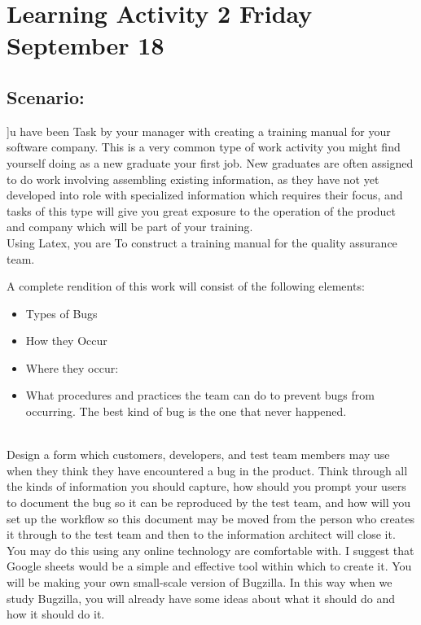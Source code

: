 \section{Learning Activity 2  Friday September 18}

\subsection{Scenario:}

]u have been Task by your manager with creating a training manual for your software company. This is a very common type of work activity you might find yourself doing as a new graduate your first job. New graduates are often assigned to do work involving assembling existing information, as they have not yet developed into role with specialized information which requires their focus, and tasks of this type will give you great exposure to the operation of the product and company which will be part of your training.
\\
Using Latex, you are To construct a training manual for the quality assurance team.

A complete rendition of this work will consist of the following elements:
\begin{itemize}
    \item Types of Bugs
    \item How they Occur   
    \item Where they occur: 
    \item What procedures and practices the team can do to prevent bugs from occurring. The best kind of bug is the one that never happened.
\end{itemize}
\\
Design a form which customers, developers, and test team members may use when they think they have encountered a bug in the product. Think through all the kinds of information you should capture, how should you prompt your users to document the bug so it can be reproduced by the test team, and how will you set up the workflow so this document may be moved from the person who creates it through to the test team and then to the information architect will close it.
\\
You may do this using any online technology are comfortable with. I suggest that Google sheets would be a simple and effective tool within which to create it. You will be making your own small-scale version of Bugzilla. In this way when we study Bugzilla, you will already have some ideas about what it should do and how it should do it.
\newline

